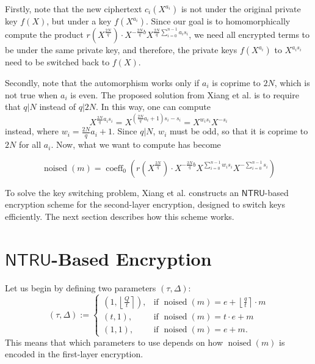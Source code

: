 Firstly, note that the new ciphertext $c_i(X^{a_i})$ is not under the original private key $f(X)$, but under a key $f(X^{a_i})$. Since our goal is to homomorphically compute the product $r(X^{\frac{2N}{q}}) \cdot X^{-\frac{2N}{q}b} X^{\frac{2N}{q}\sum_{i=0}^{n-1}a_is_i}$, we need all encrypted terms to be under the same private key, and therefore, the private keys $f(X^{a_i})$ to $X^{a_is_i}$ need to be switched back to $f(X)$.

Secondly, note that the automorphism works only if $a_i$ is coprime to $2N$, which is not true when $a_i$ is even. The proposed solution from Xiang et al. \cite{cite:fast_bootstrap_crypto23} is to require that $q | N$ instead of $q | 2N$. In this way, one can compute
$$X^{\frac{2N}{q}a_is_i} = X^{(\frac{2N}{q}a_i+1)s_i-s_i} = X^{w_is_i}X^{-s_i}$$
instead, where $w_i=\frac{2N}{q}a_i+1$. Since $q|N$, $w_i$ must be odd, so that it is coprime to $2N$ for all $a_i$. Now, what we want to compute has become

\begin{equation}
    \operatorname{noised}(m) = \operatorname{coeff}_0 \left(r(X^{\frac{2N}{q}}) \cdot X^{-\frac{2N}{q}b} X^{\sum_{i=0}^{n-1}w_is_i} X^{-\sum_{i=0}^{n-1}s_i}\right)
    \label{eq:noised_m}
\end{equation}

To solve the key switching problem, Xiang et al. \cite{cite:fast_bootstrap_crypto23} constructs an $\mathsf{NTRU}$-based encryption scheme for the second-layer encryption, designed to switch keys efficiently. The next section describes how this scheme works.

\section{$\mathsf{NTRU}$-Based Encryption}\label{sec:ntru_encr}

Let us begin by defining two parameters $(\tau, \Delta)$:
\begin{equation*}
  (\tau, \Delta) :=
    \begin{cases}
      \left(1, \left\lfloor \frac{Q}{t} \right\rceil \right), & \text{if $\operatorname{noised}(m) = e + \left \lfloor \frac{q}{t} \right \rceil \cdot m$} \\
      (t,1), & \text{if $\operatorname{noised}(m) = t \cdot e + m$}\\
      (1,1), & \text{if $\operatorname{noised}(m) = e + m$}.
    \end{cases}       
\end{equation*}
This means that which parameters to use depends on how $\operatorname{noised}(m)$ is encoded in the first-layer encryption.

